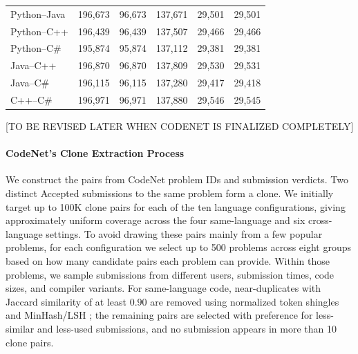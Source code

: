 \documentclass[final,5p,times,twocolumn]{elsarticle}
\theoremstyle{plain}
\begin{document}
\begin{table}[!htbp]
\begin{tabularx}{\columnwidth}{@{}X r r r r r@{}}
\quad Python--Java
&
196,673
&
96,673
&
137,671
&
29,501
&
29,501
\\

\quad Python--C++
&
196,439
&
96,439
&
137,507
&
29,466
&
29,466
\\

\quad Python--C\#
&
195,874
&
95,874
&
137,112
&
29,381
&
29,381
\\

\quad Java--C++
&
196,870
&
96,870
&
137,809
&
29,530
&
29,531
\\

\quad Java--C\#
&
196,115
&
96,115
&
137,280
&
29,417
&
29,418
\\

\quad C++--C\#
&
196,971
&
96,971
&
137,880
&
29,546
&
29,545
\\

\bottomrule
\end{tabularx}
\end{table}
[TO BE REVISED LATER WHEN CODENET IS FINALIZED COMPLETELY]
\paragraph{CodeNet's Clone Extraction Process}
We construct the pairs from CodeNet problem IDs and submission verdicts. Two distinct Accepted submissions to the same problem form a clone. We initially target up to 100K clone pairs for each of the ten language configurations, giving approximately uniform coverage across the four same-language and six cross-language settings. To avoid drawing these pairs mainly from a few popular problems, for each configuration we select up to 500 problems across eight groups based on how many candidate pairs each problem can provide. Within those problems, we sample submissions from different users, submission times, code sizes, and compiler variants. For same-language code, near-duplicates with Jaccard similarity of at least $0.90$ are removed using normalized token shingles and MinHash/LSH \cite{broder1997resemblance,indyk1998ann}; the remaining pairs are selected with preference for less-similar and less-used submissions, and no submission appears in more than 10 clone pairs.
\end{document}
